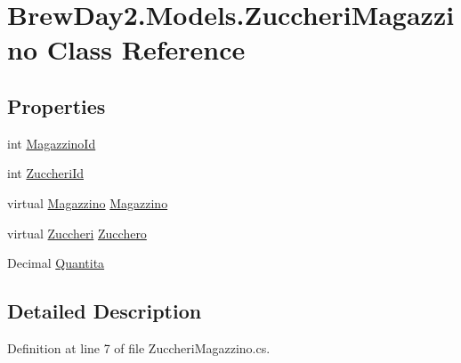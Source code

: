 \hypertarget{class_brew_day2_1_1_models_1_1_zuccheri_magazzino}{}\section{Brew\+Day2.\+Models.\+Zuccheri\+Magazzino Class Reference}
\label{class_brew_day2_1_1_models_1_1_zuccheri_magazzino}
\subsection*{Properties}
\begin{DoxyCompactItemize}
\item 
int \mbox{\hyperlink{class_brew_day2_1_1_models_1_1_zuccheri_magazzino_a84dd06631d9b90c3c92a0ca9824bbf0d}{Magazzino\+Id}}
\item 
int \mbox{\hyperlink{class_brew_day2_1_1_models_1_1_zuccheri_magazzino_ad2624788b919fc78c3ea27876fb5b59e}{Zuccheri\+Id}}
\item 
virtual \mbox{\hyperlink{class_brew_day2_1_1_models_1_1_magazzino}{Magazzino}} \mbox{\hyperlink{class_brew_day2_1_1_models_1_1_zuccheri_magazzino_ad5c620a91058302f68e66fc15187425f}{Magazzino}}
\item 
virtual \mbox{\hyperlink{class_brew_day2_1_1_models_1_1_zuccheri}{Zuccheri}} \mbox{\hyperlink{class_brew_day2_1_1_models_1_1_zuccheri_magazzino_a9a963de555ba0e8e6ed439c10994bd1b}{Zucchero}}
\item 
Decimal \mbox{\hyperlink{class_brew_day2_1_1_models_1_1_zuccheri_magazzino_a5ca436925b9041064275cd8a0b763972}{Quantita}}
\end{DoxyCompactItemize}


\subsection{Detailed Description}


Definition at line 7 of file Zuccheri\+Magazzino.\+cs.



